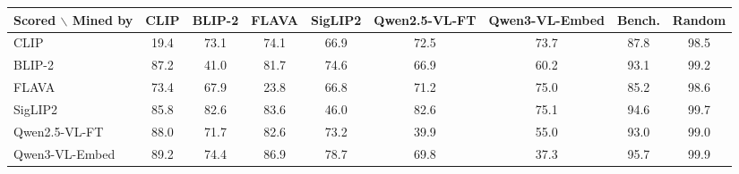 \begin{tabular}{l cccccccc}
\toprule
Scored $\backslash$ Mined by & CLIP & BLIP-2 & FLAVA & SigLIP2 & Qwen2.5-VL-FT & Qwen3-VL-Embed & Bench. & Random\\
\midrule
CLIP & 19.4 & 73.1 & 74.1 & 66.9 & 72.5 & 73.7 & 87.8 & 98.5 \\
BLIP-2 & 87.2 & 41.0 & 81.7 & 74.6 & 66.9 & 60.2 & 93.1 & 99.2 \\
FLAVA & 73.4 & 67.9 & 23.8 & 66.8 & 71.2 & 75.0 & 85.2 & 98.6 \\
SigLIP2 & 85.8 & 82.6 & 83.6 & 46.0 & 82.6 & 75.1 & 94.6 & 99.7 \\
Qwen2.5-VL-FT & 88.0 & 71.7 & 82.6 & 73.2 & 39.9 & 55.0 & 93.0 & 99.0 \\
Qwen3-VL-Embed & 89.2 & 74.4 & 86.9 & 78.7 & 69.8 & 37.3 & 95.7 & 99.9 \\
\bottomrule
\end{tabular}
